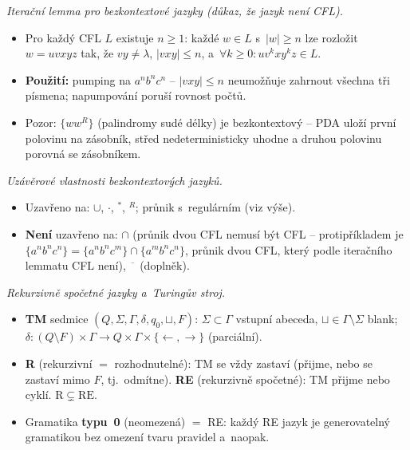 \documentclass[11pt,a4paper]{article}
\begin{document}
\begin{poznamka}
\smallskip
\emph{Iterační lemma pro bezkontextové jazyky (důkaz, že jazyk není CFL).}
\begin{itemize}
  \item Pro každý CFL $L$ existuje $n\ge 1$: každé $w\in L$ s~$|w|\ge n$ lze rozložit $w=uvxyz$ tak, že $vy\neq\lambda$, $|vxy|\le n$, a~$\forall k\ge 0\colon uv^kxy^kz\in L$.
  \item \textbf{Použití:} pumping na $a^nb^nc^n$ -- $|vxy|\le n$ neumožňuje zahrnout všechna tři písmena; napumpování poruší rovnost počtů.
  \item Pozor: $\{ww^R\}$ (palindromy sudé délky) je bezkontextový -- PDA uloží první polovinu na zásobník, střed nedeterministicky uhodne a druhou polovinu porovná se zásobníkem.
\end{itemize}

\smallskip
\emph{Uzávěrové vlastnosti bezkontextových jazyků.}
\begin{itemize}
  \item Uzavřeno na: $\cup$, $\cdot$, ${}^*$, ${}^R$; průnik s~regulárním (viz výše).
  \item \textbf{Není} uzavřeno na: $\cap$ (průnik dvou CFL nemusí být CFL -- protipříkladem je $\{a^nb^nc^n\}=\{a^nb^nc^m\}\cap\{a^mb^nc^n\}$, průnik dvou CFL, který podle iteračního lemmatu CFL není), $\overline{\phantom{x}}$ (doplněk).
\end{itemize}

\smallskip
\emph{Rekurzivně spočetné jazyky a~Turingův stroj.}
\begin{itemize}
  \item \textbf{TM} sedmice $(Q,\Sigma,\Gamma,\delta,q_0,\sqcup,F)$: $\Sigma\subset\Gamma$ vstupní abeceda, $\sqcup\in\Gamma\setminus\Sigma$ blank; $\delta\colon (Q\setminus F)\times\Gamma\to Q\times\Gamma\times\{\leftarrow,\to\}$ (parciální).
  \item \textbf{R} (rekurzivní $=$ rozhodnutelné): TM se vždy zastaví (přijme, nebo se zastaví mimo $F$, tj.\ odmítne). \textbf{RE} (rekurzivně spočetné): TM přijme nebo cyklí. $\mathrm R\subsetneq\mathrm{RE}$.
  \item Gramatika \textbf{typu~0} (neomezená) $=$ RE: každý RE jazyk je generovatelný gramatikou bez omezení tvaru pravidel a~naopak.
\end{itemize}


\end{poznamka}
\end{document}
